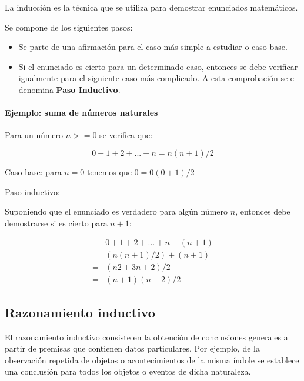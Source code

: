 \documentclass[a4paper, 11pt, titlepage]{article}
\begin{document}
            La inducción es la técnica que se utiliza para demostrar enunciados matemáticos.

            Se compone de los siguientes pasos:

            \begin{itemize}
                \item Se parte de una afirmación para el caso más simple a estudiar o caso base.
                \item Si el enunciado es cierto para un determinado caso, entonces se debe verificar
                igualmente para el siguiente caso más complicado. A esta comprobación se e denomina 
                \textbf{Paso Inductivo}.
            \end{itemize}

            \paragraph{Ejemplo: suma de números naturales}

            Para un número $n>=0$ se verifica que:

            \[ 0 + 1 + 2 + ... + n = n (n+1)/2 \]

            Caso base: para $n=0$ tenemos que $0=0(0+1)/2$

            Paso inductivo:

            Suponiendo que el enunciado es verdadero para algún número $n$, entonces debe demostrarse si
            es cierto para $n+1$:

            \begin{equation}
                \begin{split}
                    &0 + 1 + 2 + ... + n + (n+1) \\
                    = &(n(n+1)/2) + (n+1) \\
                    = &(n2 + 3n + 2) / 2 \\
                    = &(n+1)(n+2)/2    
                    \nonumber
                \end{split}
            \end{equation}


    \subsection{Razonamiento inductivo}

        El razonamiento inductivo consiste en la obtención de conclusiones generales a partir de 
        premisas que contienen datos particulares. Por ejemplo, de la observación repetida de objetos 
        o acontecimientos de la misma índole se establece una conclusión para todos los objetos o 
        eventos de dicha naturaleza.
\end{document}
